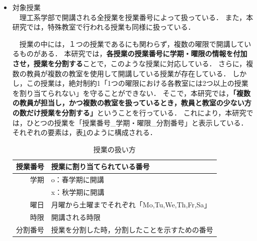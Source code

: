 \documentclass[12pt, a4paper, fleqn]{jreport}
\begin{document}
\begin{itemize}
\item 対象授業\\
　理工系学部で開講される全授業を授業番号によって扱っている．
また，本研究では，特殊教室で行われる授業も同様に扱っている．

　授業の中には，１つの授業であるにも関わらず，複数の曜限で開講しているものがある．
本研究では，{\bf 各授業の授業番号に学期・曜限の情報を付加させ，授業を分割する}ことで，このような授業に対応している．
さらに，複数の教員が複数の教室を使用して開講している授業が存在している．
しかし，この授業は，絶対制約1「1つの曜限における各教室には2つ以上の授業を割り当てられない」を守ることができない．
そこで，本研究では，{\bf 「複数の教員が担当し，かつ複数の教室を扱っているとき，教員と教室の少ない方の数だけ授業を分割する」}ということを行っている．
これにより，本研究では，ひとつの授業を「授業番号\_学期・曜限\_分割番号」と表示している．
それぞれの要素は，表\ref{jugyou}のように構成される．

\vspace{-3mm}

\begin{table}[H]
\caption{授業の扱い方}
\label{jugyou}
\begin{center}
\begin{tabular}{rl}
\hline
授業番号 & 授業に割り当てられている番号\\
\hline
学期 & o：春学期に開講\\
 & x：秋学期に開講\\
\hline
曜日 & 月曜から土曜までそれぞれ「Mo,Tu,We,Th,Fr,Sa」\\
\hline
時限 & 開講される時限\\
\hline
分割番号 & 授業を分割した時，分割したことを示すための番号\\
\hline
\end{tabular}
\end{center}
\end{table}


\end{itemize}
\end{document}
